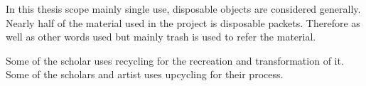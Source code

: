 
In this thesis scope mainly single use, disposable objects are considered generally. Nearly half of the material used in the project is disposable packets. Therefore as well as other words used but mainly trash is used to refer the material. 

Some of the scholar uses recycling\cite{cerny1996recycled,herman1998trashformations} for the recreation and transformation of it. Some of the scholars and artist uses upcycling for their process. 

%
